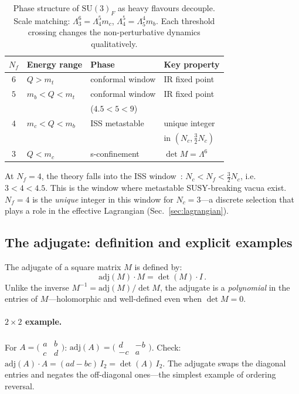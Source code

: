 \documentclass[12pt,a4paper]{article}
\newcommand{\SU}{\mathrm{SU}}
\newcommand{\Nf}{N_{\!f}}
\newcommand{\Nc}{N_{\!c}}
\newcommand{\adj}{\mathrm{adj}}
\begin{document}
\begin{table}[ht]
\centering\small
\caption{Phase structure of $\SU(3)_F$ as heavy flavours decouple.
  Scale matching: $\Lambda_3^6 = \Lambda_4^5 m_c$,
  $\Lambda_4^5 = \Lambda_5^4 m_b$.
  Each threshold crossing changes the non-perturbative dynamics
  qualitatively.}
\label{tab:phases}
\begin{tabular}{clll}
\hline
$\Nf$ & Energy range & Phase & Key property \\
\hline
$6$ & $Q > m_t$ & conformal window & IR fixed point \\
$5$ & $m_b < Q < m_t$ & conformal window & IR fixed point \\
  &  & ($4.5 < 5 < 9$) & \\
$4$ & $m_c < Q < m_b$ & ISS metastable~\cite{ISS:2006} & unique integer \\
  &  & & in $(\Nc, \tfrac{3}{2}\Nc)$ \\
$3$ & $Q < m_c$ & s-confinement & $\det M = \Lambda^6$ \\
\hline
\end{tabular}
\end{table}

At $\Nf = 4$, the theory falls into the ISS
window~\cite{ISS:2006}: $\Nc < \Nf < \frac{3}{2}\Nc$,
i.e.\ $3 < 4 < 4.5$.
This is the window where metastable SUSY-breaking vacua exist.
$\Nf = 4$ is the \emph{unique} integer in this window for
$\Nc = 3$---a discrete selection that plays a role in the
effective Lagrangian (Sec.~\ref{sec:lagrangian}).


\subsection{The adjugate: definition and explicit examples}

The adjugate of a square matrix $M$ is defined by:
\begin{equation}
  \adj(M) \cdot M = \det(M) \cdot I\,.
  \label{eq:adj_def}
\end{equation}
Unlike the inverse $M^{-1} = \adj(M)/\det M$, the adjugate
is a \emph{polynomial} in the entries of $M$---holomorphic and
well-defined even when $\det M = 0$.

\paragraph{$2 \times 2$ example.}
For
$A = \bigl(\begin{smallmatrix} a & b \\ c & d \end{smallmatrix}
\bigr)$:
$\adj(A) = \bigl(\begin{smallmatrix} d & -b \\ -c & a
\end{smallmatrix}\bigr)$.
Check: $\adj(A) \cdot A = (ad - bc)\,I_2 = \det(A)\,I_2$.
The adjugate swaps the diagonal entries and negates the
off-diagonal ones---the simplest example of ordering reversal.
\end{document}
